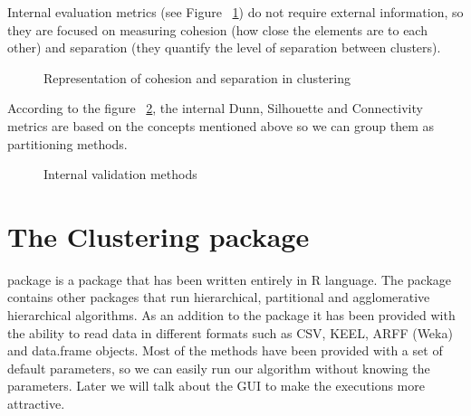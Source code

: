 Internal evaluation metrics (see Figure ~\ref{fig:cohesion}) do not require external information, so they are focused on measuring cohesion (how close the elements are to each other) and separation (they quantify the level of separation between clusters).

\begin{figure}[htbp]
  \centering
    \caption{Representation of cohesion and separation in clustering \cite{b54}}%
    \label{fig:cohesion}%
\end{figure}

According to the figure ~\ref{fig:internal}, the internal Dunn, Silhouette and Connectivity metrics are based on the concepts mentioned above so we can group them as partitioning methods.

\begin{figure}[htbp]
  \centering
    \caption{Internal validation methods \cite{b54}}%
    \label{fig:internal}%
\end{figure}

\section{The Clustering package}\label{sec:clusteringpackage}

 package is a package that has been written entirely in R language. The package contains other  packages that run hierarchical, partitional and agglomerative hierarchical algorithms. As an addition to the package it has been provided with the ability to read data in different formats such as CSV, KEEL, ARFF (Weka) and data.frame objects. Most of the methods have been provided with a set of default parameters, so we can easily run our algorithm without knowing the parameters. Later we will talk about the GUI to make the executions more attractive.

